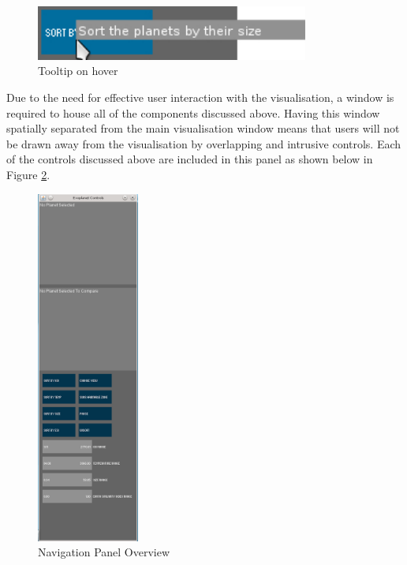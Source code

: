 \begin{figure}[H]
  \centering
      \includegraphics[width=0.8\textwidth]{images/tooltip.jpg}
  \caption{Tooltip on hover}
  \label{fig:tooltip}
\end{figure}

Due to the need for effective user interaction with the visualisation, a window
is required to house all of the components discussed above. Having this window
spatially separated from the main visualisation window means that users will not
be drawn away from the visualisation by overlapping and intrusive controls. Each
of the controls discussed above are included in this panel as shown below in
Figure \ref{fig:nav}.

\begin{figure}[H]
  \centering
      \includegraphics[width=0.3\textwidth]{images/nav.png}
  \caption{Navigation Panel Overview}
  \label{fig:nav}
\end{figure}

